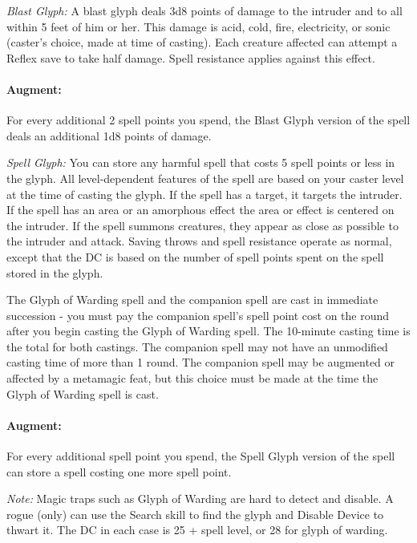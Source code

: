 \begin{list}{}{\leftmargin=1em}
 \item \emph{Blast Glyph:}
A blast glyph deals 3d8 points of damage to the intruder and to all within 5 feet of him or her. 
This damage is acid, cold, fire, electricity, or sonic (caster's choice, made at time of casting). 
Each creature affected can attempt a Reflex save to take half damage. 
Spell resistance applies against this effect.
\paragraph{Augment:} For every additional 2 spell points you spend, the Blast Glyph version of the spell deals an additional 1d8 points of damage.
 \item \emph{Spell Glyph:}
You can store any harmful spell that costs 5 spell points or less in the glyph. 
All level-dependent features of the spell are based on your caster level at the time of casting the glyph. 
If the spell has a target, it targets the intruder. 
If the spell has an area or an amorphous effect the area or effect is centered on the intruder. 
If the spell summons creatures, they appear as close as possible to the intruder and attack. 
Saving throws and spell resistance operate as normal, except that the DC is based on the number of spell points spent on the spell stored in the glyph.

The Glyph of Warding spell and the companion spell are cast in immediate succession - 
you must pay the companion spell's spell point cost on the round after you begin casting the Glyph of Warding spell. 
The 10-minute casting time is the total for both castings. The companion spell may not have an unmodified casting time of more than 1 round. 
The companion spell may be augmented or affected by a metamagic feat, but this choice must be made at the time the Glyph of Warding spell is cast.
\paragraph{Augment:} For every additional spell point you spend, the Spell Glyph version of the spell can store a spell costing one more spell point.
\end{list}
\emph{Note:} Magic traps such as Glyph of Warding are hard to detect and disable. A rogue (only) can use the Search skill to find the glyph and Disable Device to thwart it. 
The DC in each case is 25 + spell level, or 28 for glyph of warding.

